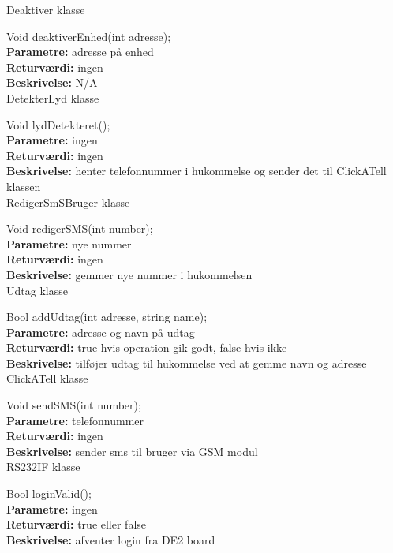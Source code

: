 {\centering Deaktiver klasse}

Void deaktiverEnhed(int adresse); \\
\textbf{Parametre:} adresse på enhed \\
\textbf{Returværdi:} ingen \\
\textbf{Beskrivelse:} N/A \\

{\centering DetekterLyd klasse}

Void lydDetekteret(); \\
\textbf{Parametre:} ingen \\
\textbf{Returværdi:} ingen \\
\textbf{Beskrivelse:} henter telefonnummer i hukommelse og sender det til ClickATell klassen \\

{\centering RedigerSmSBruger klasse}

Void redigerSMS(int number); \\
\textbf{Parametre:} nye nummer \\
\textbf{Returværdi:} ingen \\
\textbf{Beskrivelse:} gemmer nye nummer i hukommelsen \\

{\centering Udtag klasse}

Bool addUdtag(int adresse, string name); \\
\textbf{Parametre:} adresse og navn på udtag \\
\textbf{Returværdi:} true hvis operation gik godt, false hvis ikke \\
\textbf{Beskrivelse:} tilføjer udtag til hukommelse ved at gemme navn og adresse \\

{\centering ClickATell klasse}

Void sendSMS(int number); \\
\textbf{Parametre:} telefonnummer \\
\textbf{Returværdi:} ingen \\
\textbf{Beskrivelse:} sender sms til bruger via GSM modul \\

{\centering RS232IF klasse}

Bool loginValid(); \\
\textbf{Parametre:} ingen \\
\textbf{Returværdi:} true eller false \\
\textbf{Beskrivelse:} afventer login fra DE2 board \\

